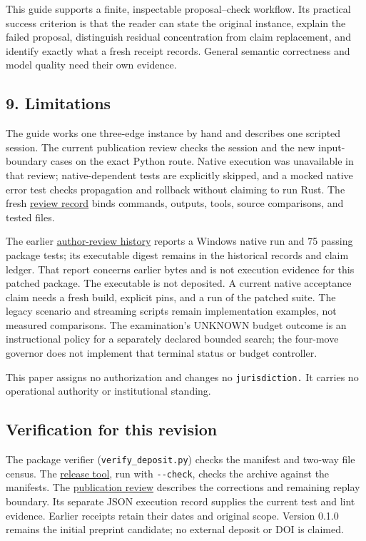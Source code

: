 \documentclass[
  11pt,
]{article}
\newcommand{\passthrough}[1]{#1}
\begin{document}
This guide supports a finite, inspectable proposal--check workflow. Its
practical success criterion is that the reader can state the original
instance, explain the failed proposal, distinguish residual
concentration from claim replacement, and identify exactly what a fresh
receipt records. General semantic correctness and model quality need
their own evidence.

\subsection{9. Limitations}\label{limitations}

The guide works one three-edge instance by hand and describes one
scripted session. The current publication review checks the session and
the new input-boundary cases on the exact Python route. Native execution
was unavailable in that review; native-dependent tests are explicitly
skipped, and a mocked native error test checks propagation and rollback
without claiming to run Rust. The fresh
\href{docs/publication_review_2026_10_02.json}{review record} binds
commands, outputs, tools, source comparisons, and tested files.

The earlier \href{paper_change_log.md}{author-review history} reports a
Windows native run and 75 passing package tests; its executable digest
remains in the historical records and claim ledger. That report concerns
earlier bytes and is not execution evidence for this patched package.
The executable is not deposited. A current native acceptance claim needs
a fresh build, explicit pins, and a run of the patched suite. The legacy
scenario and streaming scripts remain implementation examples, not
measured comparisons. The examination's UNKNOWN budget outcome is an
instructional policy for a separately declared bounded search; the
four-move governor does not implement that terminal status or budget
controller.

This paper assigns no authorization and changes no
\nolinkurl{jurisdiction.} It carries no operational authority or
institutional standing.

\subsection{Verification for this
revision}\label{verification-for-this-revision}

The package verifier (\nolinkurl{verify_deposit.py}) checks the manifest
and two-way file census. The \href{tools/rebuild_release.py}{release
tool}, run with \passthrough{\lstinline!--check!}, checks the archive
against the manifests. The
\href{docs/publication_review_2026_10_02.md}{publication review}
describes the corrections and remaining replay boundary. Its separate
JSON execution record supplies the current test and lint evidence.
Earlier receipts retain their dates and original scope. Version 0.1.0
remains the initial preprint candidate; no external deposit or DOI is
claimed.
\end{document}
